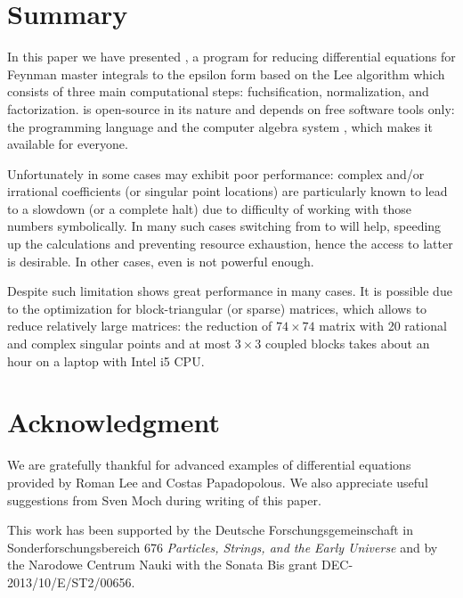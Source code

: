 \documentclass[12pt,a4paper]{article}
\begin{document}
\section{Summary}
\label{sec:4}

In this paper we have presented \fuchsia, a program for reducing differential equations for Feynman master integrals to the epsilon form based on the Lee algorithm \cite{Lee15} which consists of three main computational steps: fuchsification, normalization, and factorization.
\fuchsia is open-source in its nature and depends on free software tools only: the programming language \python and the computer algebra system \maximasage, which makes it available for everyone.

Unfortunately in some cases \fuchsia may exhibit poor performance: complex and/or irrational coefficients (or singular point locations) are particularly known to lead to a slowdown (or a complete halt) due to difficulty of working with those numbers symbolically.
In many such cases switching from \maxima to \maple will help, speeding up the calculations and preventing resource exhaustion, hence the access to latter is desirable.
In other cases, even \maple is not powerful enough.

Despite such limitation \fuchsia shows great performance in many cases.
It is possible due to the optimization for block-triangular (or sparse) matrices, which allows to reduce relatively large matrices: the reduction of ${74\times74}$ matrix with 20 rational and complex singular points and at most $3\times3$ coupled blocks takes about an hour on a laptop with Intel i5 CPU.

\section*{Acknowledgment}

We are gratefully thankful for advanced examples of differential equations provided by Roman Lee and Costas Papadopolous.
We also appreciate useful suggestions from Sven Moch during writing of this paper.

This work has been supported by the Deutsche Forschungsgemeinschaft in Sonderforschungs\-be\-reich 676 {\it Particles, Strings, and the Early Universe} and by the Narodowe Centrum Nauki with the Sonata Bis grant DEC-2013/10/E/ST2/00656.





\end{document}
